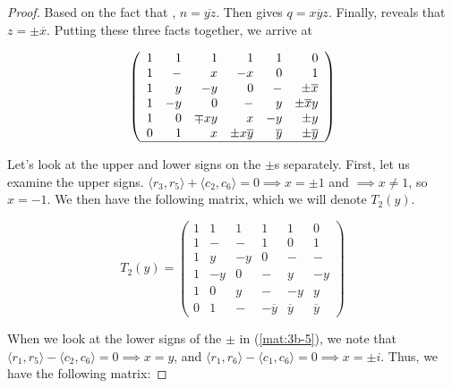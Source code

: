 \begin{lemma}
\begin{proof}
Based on the fact that , $n = \overline{yz}$. Then  gives $q=x\overline{y}z$. Finally,  reveals that $z = \pm \overline{x}$. Putting these three facts together, we arrive at

\begin{equation} \label{mat:3b-5}
\left(\begin{array}{rrrrrr}
               1 & 1 & 1 &  1 &  1 & 0 \\
               1 & - & x & -x &  0 & 1 \\
               1 & y & -y &  0 & - & \pm\overline{x} \\
               1 & -y & 0 & - & y & \pm\overline{x}y \\
               1 & 0 & \mp xy & x & -y & \pm y \\
               0 & 1 & x & \pm x\overline{y} & \overline{y} & \pm\overline{y} \\\hline
             \end{array}\right)
\end{equation}

Let's look at the upper and lower signs on the $\pm$s separately. First, let us examine the upper signs. $\langle r_3 , r_5 \rangle + \langle c_2 , c_6 \rangle = 0 \implies x = \pm 1$ and  $\implies x \neq 1$, so $x = -1$. We then have the following matrix, which we will denote $T_2(y)$.

\begin{equation} \label{mat:3b-6}
T_2(y) = \left(\begin{array}{rrrrrr}
               1 & 1 & 1 &  1 &  1 & 0 \\
               1 & - & - & 1 &  0 & 1 \\
               1 & y & -y &  0 & - & - \\
               1 & -y & 0 & - & y & -y \\
               1 & 0 & y & - & -y & y \\
               0 & 1 & - & -\overline{y} & \overline{y} & \overline{y}
             \end{array}\right)
\end{equation}

When we look at the lower signs of the $\pm$ in (\ref{mat:3b-5}), we note that $\langle r_1 , r_5 \rangle - \langle c_2 , c_6 \rangle = 0 \implies x = y$, and $\langle r_1 , r_6 \rangle - \langle c_1 , c_6 \rangle = 0 \implies x = \pm i$. Thus, we have the following matrix:


\end{proof}
\end{lemma}

